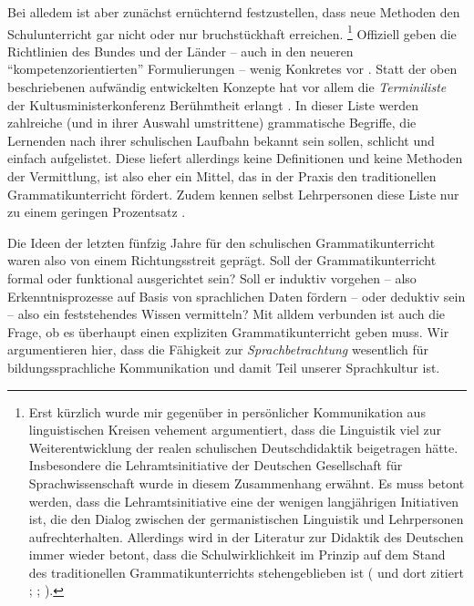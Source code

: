 Bei alledem ist aber zunächst ernüchternd festzustellen, dass neue Methoden den Schulunterricht gar nicht oder nur bruchstückhaft erreichen.%
\footnote{Erst kürzlich wurde mir gegenüber in persönlicher Kommunikation aus linguistischen Kreisen vehement argumentiert, dass die Linguistik viel zur Weiterentwicklung der realen schulischen Deutschdidaktik beigetragen hätte.
Insbesondere die Lehramtsinitiative der Deutschen Gesellschaft für Sprachwissenschaft wurde in diesem Zusammenhang erwähnt.
Es muss betont werden, dass die Lehramtsinitiative eine der wenigen langjährigen Initiativen ist, die den Dialog zwischen der germanistischen Linguistik und Lehrpersonen aufrechterhalten.
Allerdings wird in der Literatur zur Didaktik des Deutschen immer wieder betont, dass die Schulwirklichkeit im Prinzip auf dem Stand des traditionellen Grammatikunterrichts stehengeblieben ist (\zB \citealt[211]{Steets2003} und dort zitiert \citealt[143]{SteinigHuneke2002}; \citealt[243,257]{Bredel2013}; \citealt[2]{KoepckeZiegler2013}).}
Offiziell geben die Richtlinien des Bundes und der Länder -- auch in den neueren "`kompetenzorientierten"' Formulierungen -- wenig Konkretes vor \citep[250--255]{Bredel2013}.
Statt der oben beschriebenen aufwändig entwickelten Konzepte hat vor allem die \textit{Terminiliste} der Kultusministerkonferenz Berühmtheit erlangt \citep[244--249]{Bredel2013}.
In dieser Liste werden zahlreiche (und in ihrer Auswahl umstrittene) grammatische Begriffe, die Lernenden nach ihrer schulischen Laufbahn bekannt sein sollen, schlicht und einfach aufgelistet.
Diese liefert allerdings keine Definitionen und keine Methoden der Vermittlung, ist also eher ein Mittel, das in der Praxis den traditionellen Grammatikunterricht fördert.
Zudem kennen selbst Lehrpersonen diese Liste nur zu einem geringen Prozentsatz \citep{Haecker2009}.

Die Ideen der letzten fünfzig Jahre für den schulischen Grammatikunterricht waren also von einem Richtungsstreit geprägt.
Soll der Grammatikunterricht formal oder funktional ausgerichtet sein?
Soll er induktiv vorgehen -- also Erkenntnisprozesse auf Basis von sprachlichen Daten fördern -- oder deduktiv sein -- also ein feststehendes Wissen vermitteln?
Mit alldem verbunden ist auch die Frage, ob es überhaupt einen expliziten Grammatikunterricht geben muss.
Wir argumentieren hier, dass die Fähigkeit zur \textit{Sprachbetrachtung} wesentlich für bildungssprachliche Kommunikation und damit Teil unserer Sprachkultur ist.

